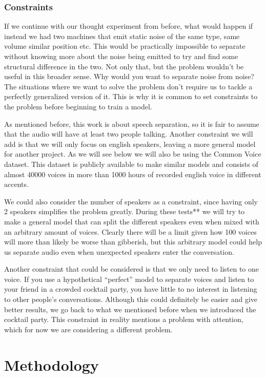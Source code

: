 \documentclass{book}
\begin{document}
\section{Constraints}
\qquad If we continue with our thought experiment from before, what would happen if instead we had two machines that emit static noise of the same type, same volume similar position etc.
This would be practically impossible to separate without knowing more about the noise being emitted to try and find some structural difference in the two.
Not only that, but the problem wouldn’t be useful in this broader sense.
Why would you want to separate noise from noise? The situations where we want to solve the problem don’t require us to tackle a perfectly generalized version of it.
This is why it is common to set constraints to the problem before beginning to train a model.
\par
As mentioned before, this work is about speech separation, so it is fair to assume that the audio will have at least two people talking.
Another constraint we will add is that we will only focus on english speakers, leaving a more general model for another project.
As we will see below we will also be using the Common Voice dataset.
This dataset is publicly available to make similar models and consists of almost 40000 voices in more than 1000 hours of recorded english voice in different accents.
\par
We could also consider the number of speakers as a constraint, since having only 2 speakers simplifies the problem greatly.
During these tests** we will try to make a general model that can split the different speakers even when mixed with an arbitrary amount of voices.
Clearly there will be a limit given how 100 voices will more than likely be worse than gibberish, but this arbitrary model could help us separate audio even when unexpected speakers enter the conversation.
\par
Another constraint that could be considered is that we only need to listen to one voice.
If you use a hypothetical “perfect” model to separate voices and listen to your friend in a crowded cocktail party, you have little to no interest in listening to other people's conversations.
Although this could definitely be easier and give better results, we go back to what we mentioned before when we introduced the cocktail party.
This constraint in reality mentions a problem with attention, which for now we are considering a different problem.

\part{Methodology}
\end{document}
